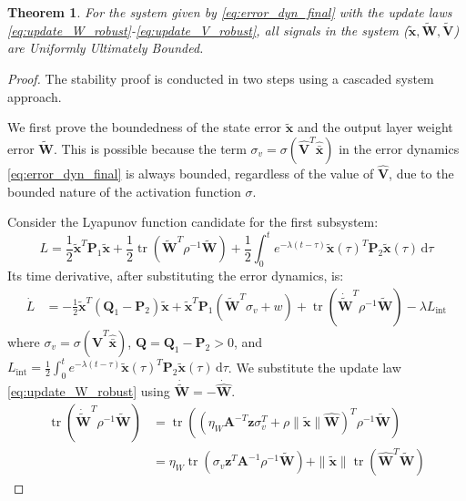 \documentclass[11pt, a4paper]{article}
\newtheorem{theorem}{Theorem}
\newcommand{\tr}{\operatorname{tr}}
\newcommand{\ud}{\,\mathrm{d}}
\newcommand{\xtilde}{\tilde{\bm{x}}}
\newcommand{\xhatbar}{\hat{\bar{\bm{x}}}}
\newcommand{\Wtilde}{\tilde{\mathbf{W}}}
\newcommand{\What}{\hat{\mathbf{W}}}
\newcommand{\Vtilde}{\tilde{\mathbf{V}}}
\newcommand{\Vhat}{\hat{\mathbf{V}}}
\begin{document}
\begin{theorem}
For the system given by \eqref{eq:error_dyn_final} with the update laws \eqref{eq:update_W_robust}-\eqref{eq:update_V_robust}, all signals in the system ($\xtilde, \Wtilde, \Vtilde$) are Uniformly Ultimately Bounded.
\end{theorem}

\begin{proof}
The stability proof is conducted in two steps using a cascaded system approach.


We first prove the boundedness of the state error $\xtilde$ and the output layer weight error $\Wtilde$. This is possible because the term $\sigma_v = \sigma(\Vhat^T \xhatbar)$ in the error dynamics \eqref{eq:error_dyn_final} is always bounded, regardless of the value of $\Vhat$, due to the bounded nature of the activation function $\sigma$.

Consider the Lyapunov function candidate for the first subsystem:
\begin{equation}
    L = \frac{1}{2}\xtilde^T \mathbf{P}_1 \xtilde + \frac{1}{2}\tr(\Wtilde^T \rho^{-1}\Wtilde) + \frac{1}{2} \int_{0}^{t} e^{-\lambda(t-\tau)} \xtilde(\tau)^T \mathbf{P}_2 \xtilde(\tau) \ud\tau
\end{equation}
Its time derivative, after substituting the error dynamics, is:
\begin{align}
    \dot{L} &= -\frac{1}{2}\xtilde^T(\mathbf{Q}_1 - \mathbf{P}_2)\xtilde + \xtilde^T\mathbf{P}_1 (\Wtilde^T \sigma_v + w) + \tr(\dot{\Wtilde}^T\rho^{-1} \Wtilde) - \lambda L_{\text{int}}
\end{align}
where $\sigma_v = \sigma(\Vhat^T\xhatbar)$, $\mathbf{Q} = \mathbf{Q}_1 - \mathbf{P}_2 > 0$, and $L_{\text{int}} = \frac{1}{2} \int_{0}^{t} e^{-\lambda(t-\tau)} \xtilde(\tau)^T \mathbf{P}_2 \xtilde(\tau) \ud\tau$.
We substitute the update law \eqref{eq:update_W_robust} using $\dot{\Wtilde} = -\dot{\What}$. 
\begin{align*}
    \tr(\dot{\Wtilde}^T \rho^{-1}\Wtilde) &= \tr\left( \left(\eta_W \mathbf{A}^{-T}\bm{z}\sigma_v^T + \rho \|\xtilde\| \What\right)^T \rho^{-1}\Wtilde \right) \\
     &= {\eta_W}\tr(\sigma_v \bm{z}^T\mathbf{A}^{-1} \rho^{-1}\Wtilde) + \|\xtilde\| \tr(\What^T \Wtilde)
\end{align*}


\end{proof}
\end{document}
